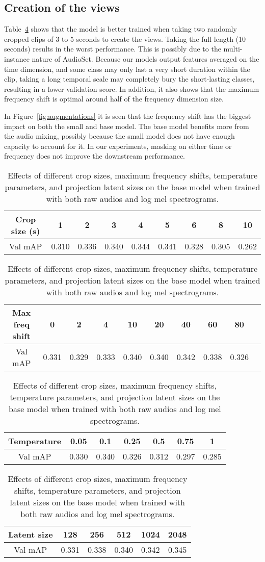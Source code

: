\documentclass{article}
\begin{document}
\subsection{Creation of the views}

Table~\ref{tab:crop} shows that the model is better trained when taking two randomly cropped clips of 3 to 5 seconds to create the views. Taking the full length (10 seconds) results in the worst performance. This is possibly due to the multi-instance nature of AudioSet. Because our models output features averaged on the time dimension, and some class may only last a very short duration within the clip, taking a long temporal scale may completely bury the short-lasting classes, resulting in a lower validation score. In addition, it also shows that the maximum frequency shift is optimal around half of the frequency dimension size.


In Figure~\ref{fig:augmentations} it is seen that the frequency shift has the biggest impact on both the small and base model. The base model benefits more from the audio mixing, possibly because the small model does not have enough capacity to account for it. In our experiments, masking on either time or frequency does not improve the downstream performance.

\begin{table}[t]
  \caption{Effects of different crop sizes, maximum frequency shifts, temperature parameters, and projection latent sizes on the base model when trained with both raw audios and log mel spectrograms.}
  \label{tab:crop}
  \centering
  \begin{tabular}{ccccccccc}
    \toprule
    Crop size (s) & 1 & 2 & 3 & 4 & 5 & 6 & 8 & 10 \\
    \midrule
    Val mAP & 0.310 & 0.336 & 0.340 & 0.344 & 0.341 & 0.328 & 0.305 & 0.262    \\
    \bottomrule
  \end{tabular}
  \begin{tabular}{cccccccccc}
    \toprule
    Max freq shift & 0 & 2 & 4  & 10 & 20 & 40 & 60 & 80 \\
    \midrule
    Val mAP & 0.331 & 0.329 & 0.333 & 0.340 & 0.340 & 0.342  & 0.338 & 0.326    \\
    \bottomrule
  \end{tabular}
  \begin{tabular}{ccccccc}
    \toprule
    Temperature & 0.05 & 0.1 & 0.25 & 0.5 & 0.75 & 1 \\
    \midrule
    Val mAP & 0.330 & 0.340 & 0.326 & 0.312 & 0.297 & 0.285    \\
    \bottomrule
  \end{tabular}
  \begin{tabular}{cccccc}
    \toprule
    Latent size & 128 & 256 & 512 & 1024 & 2048 \\
    \midrule
    Val mAP & 0.331 & 0.338 & 0.340 & 0.342 & 0.345    \\
    \bottomrule
  \end{tabular}
\end{table}
\end{document}
